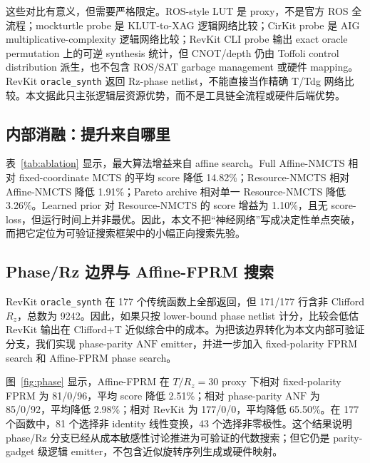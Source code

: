 \documentclass[UTF8,fontset=macnew,11pt]{ctexart}
\newcommand{\method}{Resource-NMCTS}
\newcommand{\anf}{\ensuremath{\mathrm{ANF}}}
\newcommand{\fprm}{\ensuremath{\mathrm{FPRM}}}
\newcommand{\rz}{\ensuremath{R_z}}
\begin{document}
这些对比有意义，但需要严格限定。ROS-style LUT 是 proxy，不是官方 ROS 全流程；mockturtle probe 是 KLUT-to-XAG 逻辑网络比较；CirKit probe 是 AIG multiplicative-complexity 逻辑网络比较；RevKit CLI probe 输出 exact oracle permutation 上的可逆 synthesis 统计，但 CNOT/depth 仍由 Toffoli control distribution 派生，也不包含 ROS/SAT garbage management 或硬件 mapping。RevKit \texttt{oracle\_synth} 返回 Rz-phase netlist，不能直接当作精确 T/Tdg 网络比较。本文据此只主张逻辑层资源优势，而不是工具链全流程或硬件后端优势。

\subsection{内部消融：提升来自哪里}

表~\ref{tab:ablation} 显示，最大算法增益来自 affine search。Full Affine-NMCTS 相对 fixed-coordinate MCTS 的平均 score 降低 14.82\%；Resource-NMCTS 相对 Affine-NMCTS 降低 1.91\%；Pareto archive 相对单一 \method{} 降低 3.26\%。Learned prior 对 \method{} 的 score 增益为 1.10\%，且无 score-loss，但运行时间上并非最优。因此，本文不把“神经网络”写成决定性单点突破，而把它定位为可验证搜索框架中的小幅正向搜索先验。

\begin{table}[H]
\centering
\scriptsize
\caption{搜索贡献分解。负的 mean $\Delta$ score 表示目标方法更优。}
\label{tab:ablation}

\end{table}

\subsection{Phase/Rz 边界与 Affine-FPRM 搜索}

RevKit \texttt{oracle\_synth} 在 177 个传统函数上全部返回，但 171/177 行含非 Clifford \rz{}，总数为 9242。因此，如果只按 lower-bound phase netlist 计分，比较会低估 RevKit 输出在 Clifford+T 近似综合中的成本。为把该边界转化为本文内部可验证分支，我们实现 phase-parity \anf{} emitter，并进一步加入 fixed-polarity \fprm{} search 和 Affine-FPRM phase search。

图~\ref{fig:phase} 显示，Affine-FPRM 在 $T/R_z=30$ proxy 下相对 fixed-polarity FPRM 为 81/0/96，平均 score 降低 2.51\%；相对 phase-parity \anf{} 为 85/0/92，平均降低 2.98\%；相对 RevKit 为 177/0/0，平均降低 65.50\%。在 177 个函数中，81 个选择非 identity 线性变换，43 个选择非零极性。这个结果说明 phase/Rz 分支已经从成本敏感性讨论推进为可验证的代数搜索；但它仍是 parity-gadget 级逻辑 emitter，不包含近似旋转序列生成或硬件映射。
\end{document}
